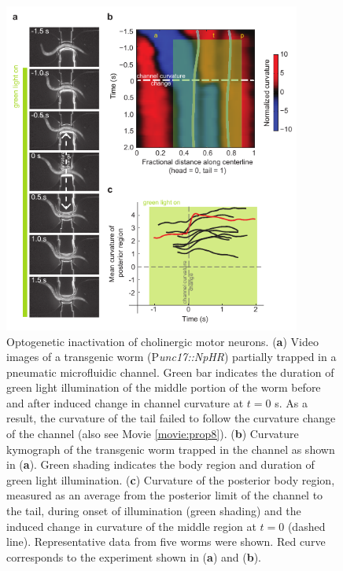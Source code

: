 \begin{figure} 
\includegraphics[width=0.87\textwidth]{figures/prop4}
\caption[ Optogenetic inactivation of cholinergic motor neurons.] { Optogenetic inactivation of cholinergic motor neurons.   
(\textbf{a}) Video images of a transgenic worm (P\textit{unc17::NpHR}) partially trapped in a pneumatic 
microfluidic channel. Green bar indicates the duration of green light illumination of the middle 
portion of the worm before and after induced change in channel curvature at $t = 0$ s. As a result, 
the curvature of the tail failed to follow the curvature change of the channel (also see 
Movie  \ref{movie:prop8}). 
(\textbf{b}) Curvature kymograph of the transgenic worm trapped in the channel as shown in (\textbf{a}). Green 
shading indicates the body region and duration of green light illumination. 
(\textbf{c}) Curvature of the posterior body region, measured as an average from the posterior limit of the 
channel to the tail, during onset of illumination (green shading) and the induced change in 
curvature of the middle region at $t = 0$ (dashed line). Representative data from five worms were 
shown. Red curve corresponds to the experiment shown in (\textbf{a}) and (\textbf{b}). 
\label{fig:prop4}}
\end{figure}

